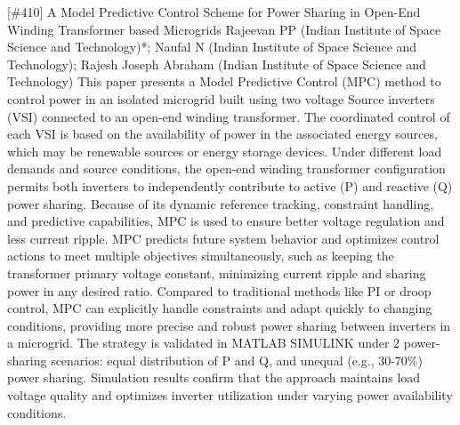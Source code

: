 {} \begin{abstract_online} {[\#410] A Model Predictive Control Scheme for Power Sharing in Open-End Winding Transformer based Microgrids} {} {Rajeevan PP (Indian Institute of Space Science and Technology)*; Naufal N (Indian Institute of Space Science and Technology); Rajesh Joseph Abraham (Indian Institute of Space Science and Technology)} {} This paper presents a Model Predictive Control (MPC) method to control power in an isolated microgrid built using two voltage Source inverters (VSI) connected to an open-end winding transformer. The coordinated control of each VSI is based on the availability of power in the associated energy sources, which may be renewable sources or energy storage devices. Under different load demands and source conditions, the open-end winding transformer configuration permits both inverters to independently contribute to active (P) and reactive (Q) power sharing. Because of its dynamic reference tracking, constraint handling, and predictive capabilities, MPC is used to ensure better voltage regulation and less current ripple. MPC predicts future system behavior and optimizes control actions to meet multiple objectives simultaneously, such as keeping the transformer primary voltage constant, minimizing current ripple and sharing power in any desired ratio. Compared to traditional methods like PI or droop control, MPC can explicitly handle constraints and adapt quickly to changing conditions, providing more precise and robust power sharing between inverters in a microgrid. The strategy is validated in MATLAB SIMULINK under 2 power-sharing scenarios: equal distribution of P and Q, and unequal (e.g., 30-70\%) power sharing. Simulation results confirm that the approach maintains load voltage quality and optimizes inverter utilization under varying power availability conditions. \end{abstract_online} 

